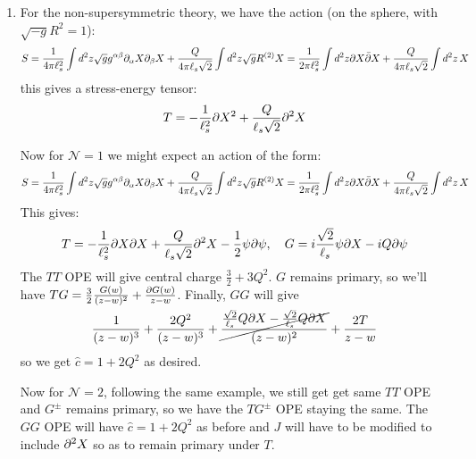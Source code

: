 \documentclass[11pt]{article}
\begin{document}
\begin{enumerate}
	\item For the non-supersymmetric theory, we have the action (on the sphere, with $\sqrt{-g} R^{2} = 1$):
	\[
		S = \frac{1}{4\pi \ell_s^2} \int d^2 z \sqrt{g} g^{\alpha \beta} \partial_\alpha X \partial_\beta X + \frac{Q}{4 \pi \ell_s \sqrt 2} \int d^2 z \sqrt{g} R^{(2)} X = \frac{1}{2\pi \ell_s^2} \int d^2 z \partial X \bar {\partial} X + \frac{Q}{4 \pi \ell_s \sqrt 2} \int d^2 z \, X
	\]
	this gives a stress-energy tensor:
	\[
		T = - \frac{1}{\ell_s^2} \partial X^2 + \frac{Q}{\ell_s \sqrt 2} \partial^2 X
	\]
	
	Now for $\mathcal N = 1$ we might expect an action of the form:
	\[
		S = \frac{1}{4\pi \ell_s^2} \int d^2 z \sqrt{g} g^{\alpha \beta} \partial_\alpha X \partial_\beta X + \frac{Q}{4 \pi \ell_s \sqrt 2} \int d^2 z \sqrt{g} R^{(2)} X = \frac{1}{2\pi \ell_s^2} \int d^2 z \partial X \bar {\partial} X + \frac{Q}{4 \pi \ell_s \sqrt 2} \int d^2 z \, X
	\]
	This gives:
	\[
		T = - \frac{1}{\ell_s^2} \partial X \partial X + \frac{Q}{\ell_s \sqrt 2} \partial^2 X - \frac12 \psi \partial \psi, \quad G = i \frac{\sqrt 2}{\ell_s} \psi \partial X - i Q \partial \psi
	\]
	The $TT$ OPE will give central charge $\frac32 + 3 Q^2$. $G$ remains primary, so we'll have $T G = \frac32 \frac{G(w)}{(z-w)^2} + \frac{\partial G(w)}{z-w}$. Finally, $G G$ will give
	\[
		\frac{1}{(z-w)^3} + \frac{2 Q^2}{(z-w)^3} + \cancel{\frac{\frac{\sqrt 2}{\ell_s} Q \partial X - \frac{\sqrt 2}{\ell_s} Q \partial X}{(z-w)^2}} + \frac{2T}{z-w}
	\]
	so we get $\hat c = 1 + 2 Q^2$ as desired. 
	
	Now for $\mathcal N = 2$, following the same example, we still get get same $TT$ OPE and $G^{\pm}$ remains primary, so we have the $T G^\pm$ OPE staying the same. The $G G$ OPE will have $\hat c = 1 + 2 Q^2$ as before and $J$ will have to be modified to include $\partial^2 X$ so as to remain primary under $T$.


\end{enumerate}
\end{document}
